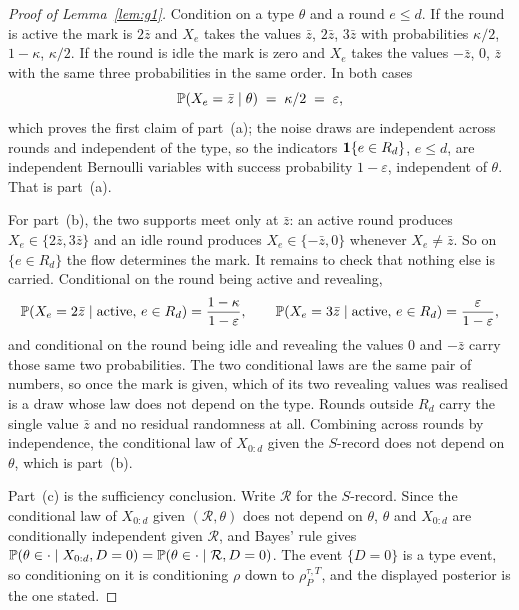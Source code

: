 \begin{proof}[Proof of Lemma~\ref{lem:g1}]
Condition on a type $\theta$ and a round $e \le d$. If the round is active the mark is $2\bar z$
and $X_e$ takes the values $\bar z$, $2\bar z$, $3\bar z$ with probabilities $\kappa/2$,
$1-\kappa$, $\kappa/2$. If the round is idle the mark is zero and $X_e$ takes the values
$-\bar z$, $0$, $\bar z$ with the same three probabilities in the same order. In both cases
\[
\mathbb{P}(X_e = \bar z \mid \theta) \;=\; \kappa/2 \;=\; \varepsilon ,
\]
which proves the first claim of part~(a); the noise draws are independent across rounds and
independent of the type, so the indicators $\mathbf{1}\{e \in R_d\}$, $e \le d$, are independent
Bernoulli variables with success probability $1-\varepsilon$, independent of $\theta$. That is
part~(a).

For part~(b), the two supports meet only at $\bar z$: an active round produces
$X_e \in \{2\bar z, 3\bar z\}$ and an idle round produces $X_e \in \{-\bar z, 0\}$ whenever
$X_e \neq \bar z$. So on $\{e \in R_d\}$ the flow determines the mark. It remains to check that
nothing else is carried. Conditional on the round being active and revealing,
\[
\mathbb{P}(X_e = 2\bar z \mid \text{active},\, e \in R_d) = \frac{1-\kappa}{1-\varepsilon},
\qquad
\mathbb{P}(X_e = 3\bar z \mid \text{active},\, e \in R_d) = \frac{\varepsilon}{1-\varepsilon},
\]
and conditional on the round being idle and revealing the values $0$ and $-\bar z$ carry those
same two probabilities. The two conditional laws are the same pair of numbers, so once the mark
is given, which of its two revealing values was realised is a draw whose law does not depend on
the type. Rounds outside $R_d$ carry the single value $\bar z$ and no residual randomness at all.
Combining across rounds by independence, the conditional law of $X_{0:d}$ given the $S$-record
does not depend on $\theta$, which is part~(b).

Part~(c) is the sufficiency conclusion. Write $\mathcal R$ for the $S$-record. Since the
conditional law of $X_{0:d}$ given $(\mathcal R,\theta)$ does not depend on $\theta$,
$\theta$ and $X_{0:d}$ are conditionally independent given $\mathcal R$, and Bayes' rule gives
$\mathbb{P}(\theta \in \cdot \mid X_{0:d}, D=0) = \mathbb{P}(\theta \in \cdot \mid \mathcal R, D=0)$. The
event $\{D=0\}$ is a type event, so conditioning on it is conditioning $\rho$ down to
$\rho_P^{\tau,T}$, and the displayed posterior is the one stated.
\end{proof}

